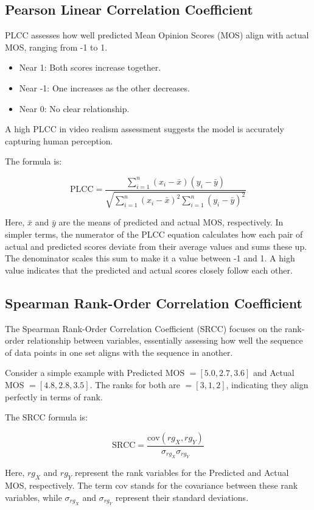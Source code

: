 \documentclass[a4paper,12pt,openright]{book}
\begin{document}
\subsection{Pearson Linear Correlation Coefficient}

PLCC assesses how well predicted Mean Opinion Scores (MOS) align with actual MOS, ranging from -1 to 1.

\begin{itemize}
    \item Near 1: Both scores increase together.
    \item Near -1: One increases as the other decreases.
    \item Near 0: No clear relationship.
\end{itemize}

A high PLCC in video realism assessment suggests the model is accurately capturing human perception.

The formula is:

\[
\text{PLCC} = \frac{\sum_{i=1}^{n}{(x_i - \bar{x})(y_i - \bar{y})}}{\sqrt{\sum_{i=1}^{n}{(x_i - \bar{x})^2} \sum_{i=1}^{n}{(y_i - \bar{y})^2}}}
\]

Here, \( \bar{x} \) and \( \bar{y} \) are the means of predicted and actual MOS, respectively.
In simpler terms, the numerator of the PLCC equation calculates how each pair of actual and predicted scores deviate from their average values and sums these up. The denominator scales this sum to make it a value between -1 and 1. A high value indicates that the predicted and actual scores closely follow each other.

\subsection{Spearman Rank-Order Correlation Coefficient}

The Spearman Rank-Order Correlation Coefficient (SRCC) focuses on the rank-order relationship between variables, essentially assessing how well the sequence of data points in one set aligns with the sequence in another. 

Consider a simple example with Predicted MOS \(= [5.0, 2.7, 3.6]\) and Actual MOS \(= [4.8, 2.8, 3.5]\). The ranks for both are \(= [3, 1, 2]\), indicating they align perfectly in terms of rank.

The SRCC formula is:

\[
\text{SRCC} = \frac{\text{cov}(rg_X, rg_Y)}{\sigma_{rg_X} \sigma_{rg_Y}}
\]

Here, \(rg_X\) and \(rg_Y\) represent the rank variables for the Predicted and Actual MOS, respectively. The term \(\text{cov}\) stands for the covariance between these rank variables, while \(\sigma_{rg_X}\) and \(\sigma_{rg_Y}\) represent their standard deviations. 
\end{document}
